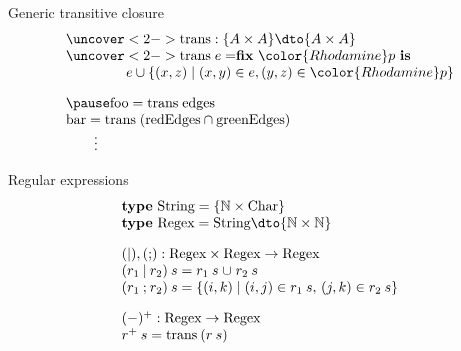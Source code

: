 \documentclass[dvipsnames,fleqn]{beamer}
\newcommand\kw\textbf
\newcommand\name\text
\newcommand\tset[1]{\{{#1}\}}
\newcommand\x\times
\newcommand\N{\mathbb{N}}
\newcommand\eset[1]{\{{#1}\}}
\newcommand\esetfor[2]{\eset{{#1} \mathrel{|} {#2}}}
\newcommand\efix[1]{\kw{fix}~{#1}~\kw{is}\;}
\newcommand\efixh[1]{\efix{\hilit #1}}
\newcommand\hilit{\color{Rhodamine}}
\begin{document}
\begin{frame}{Generic transitive closure}
  \[
  \begin{array}{l}
    \uncover<2->{\name{trans} : \tset{A \x A} \dto \tset{A \x A}}
    \\
    \uncover<2->{\name{trans} \;e =} \efixh{p}\\
    \phantom{\name{trans} \;e ={}}
    e \cup
    \esetfor{(x,z)}{(x,y) \in e, (y,z) \in \hilit p}
    \\[1em]\pause
    \name{foo} = \name{trans}\;\name{edges}\\
    \name{bar} = \name{trans}\;(\name{redEdges} \cap \name{greenEdges})\\
    \phantom{\name{bar}\hspace{.56em}} \vdots
  \end{array}
  \]
  \vfill
\end{frame}

\newcommand\regexor{\mathbin{|}}
\newcommand\regexthen{\mathbin{;}}

\begin{frame}{Regular expressions}
  \[
  \begin{array}{l}
    \kw{type}~ \name{String} = \tset{\N \x \name{Char}}\\
    \kw{type}~ \name{Regex} = \name{String} \dto \tset{\N \x \N}
    \\[1em]
    (\regexor), (\regexthen) : \name{Regex} \x \name{Regex} \to \name{Regex}
    \\
    (r_1 \regexor r_2) \:s = r_1\:s \mathrel{\cup} r_2\:s\\
    (r_1 \regexthen r_2) \:s = \esetfor{(i,k)}{(i,j) \in r_1\:s,\, (j,k) \in r_2\:s}
    \\[1em]
    (-)^+ : \name{Regex} \to \name{Regex}\\
    r^+ \:s = \name{trans} \:(r\:s)
  \end{array}
  \]
  \vfill
\end{frame}
\end{document}
